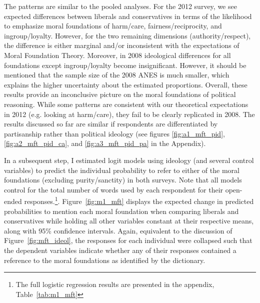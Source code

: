 \documentclass[12pt]{article}
\begin{document}
The patterns are similar to the pooled analyses. For the 2012 survey, we see expected differences between liberals and conservatives in terms of the likelihood to emphasize moral foundations of harm/care, fairness/reciprocity, and ingroup/loyalty. However, for the two remaining dimensions (authority/respect), the difference is either marginal and/or inconsistent with the expectations of Moral Foundation Theory. Moreover, in 2008 ideological differences for all foundations except ingroup/loyalty become insignificant. However, it should be mentioned that the sample size of the 2008 ANES is much smaller, which explains the higher uncertainty about the estimated proportions. Overall, these results provide an inconclusive picture on the moral foundations of political reasoning. While some patterns are consistent with our theoretical expectations in 2012 (e.g. looking at harm/care), they fail to be clearly replicated in 2008. The results discussed so far are similar if respondents are differentiated by partisanship rather than political ideology (see figures \ref{fig:a1_mft_pid}, \ref{fig:a2_mft_pid_ca}, and \ref{fig:a3_mft_pid_pa} in the Appendix).

In a subsequent step, I estimated logit models using ideology (and several control variables) to predict the individual probability to refer to either of the moral foundations (excluding purity/sanctity) in both surveys. Note that all models control for the total number of words used by each respondent for their open-ended responses.\footnote{The full logistic regression results are presented in the appendix, Table~\ref{tab:m1_mft}}. Figure~\ref{fig:m1_mft} displays the expected change in predicted probabilities to mention each moral foundation when comparing liberals and conservatives while holding all other variables constant at their respective means, along with 95\% confidence intervals. Again, equivalent to the discussion of Figure~\ref{fig:mft_ideol}, the responses for each individual were collapsed such that the dependent variables indicate whether any of their responses contained a reference to the moral foundations as identified by the dictionary. 
\end{document}
